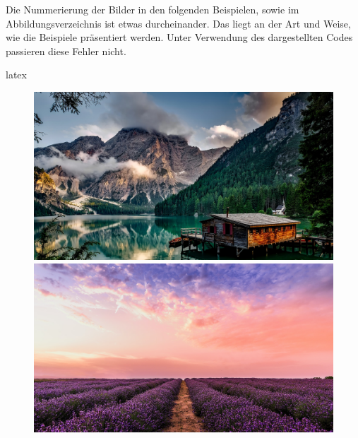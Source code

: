 \begin{information}
    Die Nummerierung der Bilder in den folgenden Beispielen, sowie im Abbildungsverzeichnis ist etwas durcheinander. Das liegt an der Art und Weise, wie die Beispiele präsentiert werden. Unter Verwendung des dargestellten Codes passieren diese Fehler nicht.
\end{information}

\begin{showcase}
    \begin{code}{latex}
        \begin{figure}
            \centering
            \begin{minipage}[c]{0.49\columnwidth}
                \includegraphics[width=\linewidth]{assets/images/bilder/pexels-pixabay-147411.jpg}
            \end{minipage}
            \hfill
            \begin{minipage}[c]{0.49\columnwidth}
                \includegraphics[width=\linewidth]{assets/images/bilder/pexels-david-bartus-1166209.jpg}

\end{minipage}
\end{figure}
\end{code}
\end{showcase}
